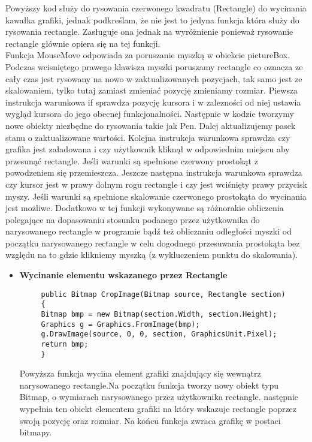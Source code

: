 \begin{itemize}
Powyższy kod służy do rysowania czerwonego kwadratu (Rectangle) do wycinania kawałka grafiki, jednak podkreślam, że nie jest to jedyna funkcja która służy do rysowania rectangle. Zasługuje ona jednak na wyróżnienie ponieważ rysowanie rectangle głównie opiera się na tej funkcji.\\
Funkcja MouseMove odpowiada za poruszanie myszką w obiekcie pictureBox. Podczas wcisniętego prawego klawisza myszki poruszamy rectangle co oznacza ze cały czas jest rysowany na nowo w zaktualizowanych pozycjach, tak samo jest ze skalowaniem, tylko tutaj zamiast zmieniać pozycję zmieniamy rozmiar.	Piewsza instrukcja warunkowa if sprawdza pozycję kursora i w zalezności od niej ustawia wygląd kursora do jego obecnej funkcjonalności. Następnie w kodzie tworzymy nowe obiekty niezbędne do rysowania takie jak Pen. Dalej aktualizujemy pasek stanu o zaktualizowane wartości. Kolejna instrukcja warunkowa sprawdza czy grafika jest załadowana i czy użytkownik kliknął w odpowiednim miejscu aby przesunąć rectangle. Jeśli warunki są spełnione czerwony prostokąt z powodzeniem się przemieszcza. Jeszcze następna instrukcja warunkowa sprawdza czy kursor jest w prawy dolnym rogu rectangle i czy jest wciśnięty prawy przycisk myszy. Jeśli warunki są spełnione skalowanie czerwonego prostokąta do wycinania jest możliwe. 	Dodatkowo w tej funkcji wykonywane są różnorakie obliczenia polegające na dopasowaniu stosunku podanego przez użytkownika do narysowanego rectangle w programie bądź też obliczaniu odległości myszki od początku narysowanego rectangle w celu dogodnego przesuwania prostokąta bez względu na to gdzie klikniemy myszką (z wykluczeniem punktu do skalowania).\\
\end{itemize}


\begin{itemize}
\item \textbf{Wycinanie elementu wskazanego przez Rectangle}\\
\begin{lstlisting}
	 public Bitmap CropImage(Bitmap source, Rectangle section)
	 {
	 Bitmap bmp = new Bitmap(section.Width, section.Height);	
	 Graphics g = Graphics.FromImage(bmp);
	 g.DrawImage(source, 0, 0, section, GraphicsUnit.Pixel);	
	 return bmp;
	 } 

\end{lstlisting}
Powyższa funkcja wycina element grafiki znajdujący się wewnątrz narysowanego rectangle.Na początku funkcja tworzy nowy obiekt typu Bitmap, o wymiarach narysowanego przez użytkownika rectangle. następnie wypełnia ten obiekt elementem grafiki na który wskazuje rectangle poprzez swoją pozycję oraz rozmiar. Na końcu funkcja zwraca grafikę w postaci bitmapy.
\end{itemize}


